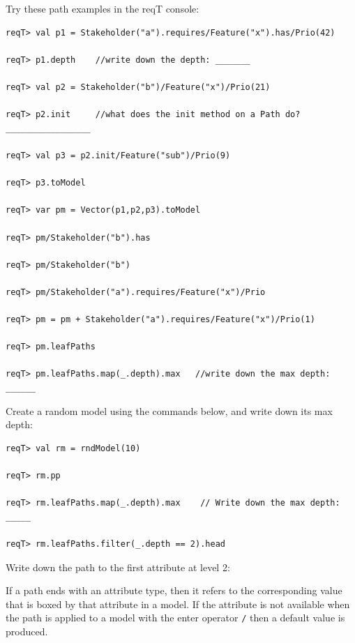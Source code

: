 \documentclass[11pt]{article}
\begin{document}
\begin{framed}\noindent
Try these path examples in the reqT console: 
{\scriptsize \begin{verbatim}
reqT> val p1 = Stakeholder("a").requires/Feature("x").has/Prio(42)

reqT> p1.depth    //write down the depth: _______

reqT> val p2 = Stakeholder("b")/Feature("x")/Prio(21)

reqT> p2.init     //what does the init method on a Path do? _________________ 

reqT> val p3 = p2.init/Feature("sub")/Prio(9)

reqT> p3.toModel

reqT> var pm = Vector(p1,p2,p3).toModel

reqT> pm/Stakeholder("b").has

reqT> pm/Stakeholder("b")

reqT> pm/Stakeholder("a").requires/Feature("x")/Prio

reqT> pm = pm + Stakeholder("a").requires/Feature("x")/Prio(1)

reqT> pm.leafPaths

reqT> pm.leafPaths.map(_.depth).max   //write down the max depth: ______
\end{verbatim}}
\end{framed}
\begin{framed}\noindent
Create a random model using the commands below, and write down its max depth: \underline{\hspace{1cm}}
{\scriptsize \begin{verbatim}
reqT> val rm = rndModel(10)
 
reqT> rm.pp

reqT> rm.leafPaths.map(_.depth).max    // Write down the max depth: _____

reqT> rm.leafPaths.filter(_.depth == 2).head
\end{verbatim}}
\noindent Write down the path to the first attribute at level 2:\newline\newline
\underline{\hspace{11cm}}
\end{framed}
 
If a path ends with an attribute type, then it refers to the corresponding value that is boxed by that attribute in a model. If the attribute is not available when the path is applied to a model with the enter operator \verb+/+ then a default value is produced. 
\end{document}
